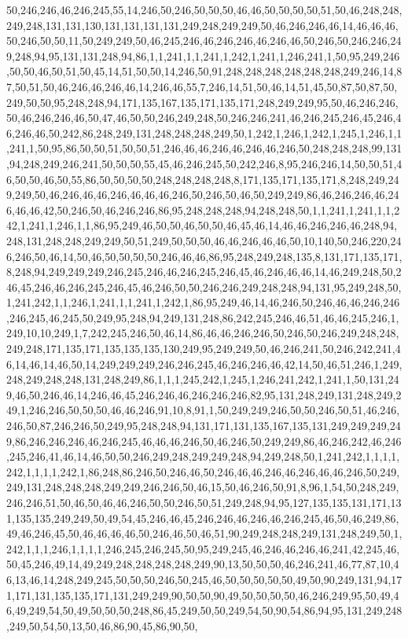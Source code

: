 50,246,246,46,246,245,55,14,246,50,246,50,50,50,46,46,50,50,50,50,51,50,46,248,248,249,248,131,131,130,131,131,131,131,249,248,249,249,50,46,246,246,46,14,46,46,46,50,246,50,50,11,50,249,249,50,46,245,246,46,246,246,46,246,46,50,246,50,246,246,249,248,94,95,131,131,248,94,86,1,1,241,1,1,241,1,242,1,241,1,246,241,1,50,95,249,246,50,50,46,50,51,50,45,14,51,50,50,14,246,50,91,248,248,248,248,248,248,249,246,14,87,50,51,50,46,246,46,246,46,14,246,46,55,7,246,14,51,50,46,14,51,45,50,87,50,87,50,249,50,50,95,248,248,94,171,135,167,135,171,135,171,248,249,249,95,50,46,246,246,50,46,246,246,46,50,47,46,50,50,246,249,248,50,246,246,241,46,246,245,246,45,246,46,246,46,50,242,86,248,249,131,248,248,248,249,50,1,242,1,246,1,242,1,245,1,246,1,1,241,1,50,95,86,50,50,51,50,50,51,246,46,46,246,46,246,46,246,50,248,248,248,99,131,94,248,249,246,241,50,50,50,55,45,46,246,245,50,242,246,8,95,246,246,14,50,50,51,46,50,50,46,50,55,86,50,50,50,50,248,248,248,248,8,171,135,171,135,171,8,248,249,249,249,50,46,246,46,46,246,46,46,46,246,50,246,50,46,50,249,249,86,46,246,246,46,246,46,46,42,50,246,50,46,246,246,86,95,248,248,248,94,248,248,50,1,1,241,1,241,1,1,242,1,241,1,246,1,1,86,95,249,46,50,50,46,50,50,46,45,46,14,46,46,246,246,46,248,94,248,131,248,248,249,249,50,51,249,50,50,50,46,46,246,46,46,50,10,140,50,246,220,246,246,50,46,14,50,46,50,50,50,50,246,46,46,86,95,248,249,248,135,8,131,171,135,171,8,248,94,249,249,249,246,245,246,46,246,245,246,45,46,246,46,46,14,46,249,248,50,246,45,246,46,246,245,246,45,46,246,50,50,246,246,249,248,248,94,131,95,249,248,50,1,241,242,1,1,246,1,241,1,1,241,1,242,1,86,95,249,46,14,46,246,50,246,46,46,246,246,246,245,46,245,50,249,95,248,94,249,131,248,86,242,245,246,46,51,46,46,245,246,1,249,10,10,249,1,7,242,245,246,50,46,14,86,46,46,246,246,50,246,50,246,249,248,248,249,248,171,135,171,135,135,135,130,249,95,249,249,50,46,246,241,50,246,242,241,46,14,46,14,46,50,14,249,249,249,246,246,245,46,246,246,46,42,14,50,46,51,246,1,249,248,249,248,248,131,248,249,86,1,1,1,245,242,1,245,1,246,241,242,1,241,1,50,131,249,46,50,246,46,14,246,46,45,246,246,46,246,246,246,82,95,131,248,249,131,248,249,249,1,246,246,50,50,50,46,46,246,91,10,8,91,1,50,249,249,246,50,50,246,50,51,46,246,246,50,87,246,246,50,249,95,248,248,94,131,171,131,135,167,135,131,249,249,249,249,86,246,246,246,46,246,245,46,46,46,246,50,46,246,50,249,249,86,46,246,242,46,246,245,246,41,46,14,46,50,50,246,249,248,249,249,248,94,249,248,50,1,241,242,1,1,1,1,242,1,1,1,1,242,1,86,248,86,246,50,246,46,50,246,46,46,246,46,246,46,46,246,50,249,249,131,248,248,248,249,249,246,246,50,46,15,50,46,246,50,91,8,96,1,54,50,248,249,246,246,51,50,46,50,46,46,246,50,50,246,50,51,249,248,94,95,127,135,135,131,171,131,135,135,249,249,50,49,54,45,246,46,45,246,246,46,246,46,246,245,46,50,46,249,86,49,46,246,45,50,46,46,46,46,50,246,46,50,46,51,90,249,248,248,249,131,248,249,50,1,242,1,1,1,246,1,1,1,1,246,245,246,245,50,95,249,245,46,246,46,246,46,241,42,245,46,50,45,246,49,14,49,249,248,248,248,248,249,90,13,50,50,50,46,246,241,46,77,87,10,46,13,46,14,248,249,245,50,50,50,246,50,245,46,50,50,50,50,50,49,50,90,249,131,94,171,171,131,135,135,171,131,249,249,90,50,50,90,49,50,50,50,50,46,246,249,95,50,49,46,49,249,54,50,49,50,50,50,248,86,45,249,50,50,249,54,50,90,54,86,94,95,131,249,248,249,50,54,50,13,50,46,86,90,45,86,90,50,